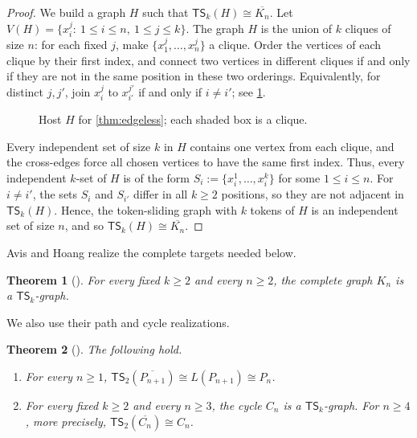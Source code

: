 \documentclass[a4paper]{article}
\theoremstyle{plain}
\newtheorem{theorem}{Theorem}[section]
\theoremstyle{definition}
\newcommand{\TSsym}{\mathsf{TS}}
\numberwithin{equation}{section}
\begin{document}
\begin{proof}
We build a graph $H$ such that $\TSsym_k(H)\cong\overline{K_n}$.
Let $V(H)=\{x_i^j:\ 1\le i\le n,\ 1\le j\le k\}$.
The graph $H$ is the union of $k$ cliques of size $n$: for each fixed $j$, make $\{x_1^j,\dots,x_n^j\}$ a clique.
Order the vertices of each clique by their first index, and connect two vertices in different cliques if and only if they are not in the same position in these two orderings.
Equivalently, for distinct $j,j'$, join $x_i^j$ to $x_{i'}^{j'}$ if and only if $i\ne i'$; see \cref{fig:edgeless-construction}.

\begin{figure}[ht]
\centering

\caption{Host $H$ for \cref{thm:edgeless}; each shaded box is a clique.}
\label{fig:edgeless-construction}
\end{figure}

Every independent set of size $k$ in $H$ contains one vertex from each clique, and the cross-edges force all chosen vertices to have the same first index.
Thus, every independent $k$-set of $H$ is of the form $S_i:=\{x_i^1,\dots,x_i^k\}$ for some $1\le i\le n$.
For $i\ne i'$, the sets $S_i$ and $S_{i'}$ differ in all $k\ge 2$ positions, so they are not adjacent in $\TSsym_k(H)$.
Hence, the token-sliding graph with $k$ tokens of $H$ is an independent set of size $n$, and so $\TSsym_k(H)\cong\overline{K_n}$.
\end{proof}

Avis and Hoang realize the complete targets needed below.

\begin{theorem}[{\cite[Cor.~4]{AvisHoang2023}}]
\label{thm:complete-graphs-realizable}
For every fixed $k\ge 2$ and every $n\ge 2$, the complete graph $K_n$ is a $\TSsym_k$-graph.
\end{theorem}

We also use their path and cycle realizations.

\begin{theorem}[{\cite[Cor.~5]{AvisHoang2023}}]
\label{thm:paths-cycles}
The following hold.
\begin{enumerate}[label=\textup{(\alph*)},leftmargin=2em]
\item For every $n\ge 1$, $\TSsym_2(\overline{P_{n+1}})\cong L(P_{n+1})\cong P_n$.
\item For every fixed $k\ge 2$ and every $n\ge 3$, the cycle $C_n$ is a $\TSsym_k$-graph.
For $n\ge 4$, more precisely, $\TSsym_2(\overline{C_n})\cong C_n$.
\end{enumerate}
\end{theorem}
\end{document}
